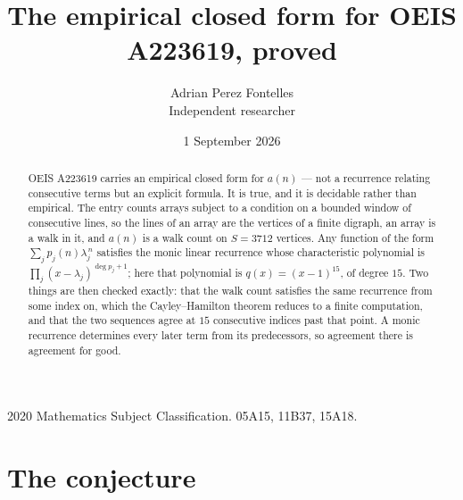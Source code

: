 \documentclass[11pt,a4paper]{article}
\title{The empirical closed form for OEIS A223619, proved}
\author{Adrian Perez Fontelles\\ \small Independent researcher}
\date{1 September 2026}
\theoremstyle{plain}
\theoremstyle{definition}
\begin{document}
\maketitle

\begin{abstract}
OEIS A223619 carries an empirical closed form for $a(n)$ --- not a recurrence relating
consecutive terms but an explicit formula. It is true, and it is decidable rather than
empirical. The entry counts arrays subject to a condition on a bounded window of consecutive lines, so the lines of an array are the
vertices of a finite digraph, an array is a walk in it, and $a(n)$ is a walk count on
$S=3712$ vertices. Any function of the form $\sum_j p_j(n)\lambda_j^{\,n}$ satisfies the
monic linear recurrence whose characteristic polynomial is
$\prod_j(x-\lambda_j)^{\deg p_j+1}$; here that polynomial is $q(x)=(x-1)^{15}$, of degree
$15$. Two things are then checked exactly: that the walk count satisfies the same
recurrence from some index on, which the Cayley--Hamilton theorem reduces to a finite
computation, and that the two sequences agree at $15$ consecutive indices past that
point. A monic recurrence determines every later term from its predecessors, so agreement
there is agreement for good.
\end{abstract}

\noindent\small 2020 Mathematics Subject Classification. 05A15, 11B37, 15A18.\normalsize

\section{The conjecture}
\end{document}
